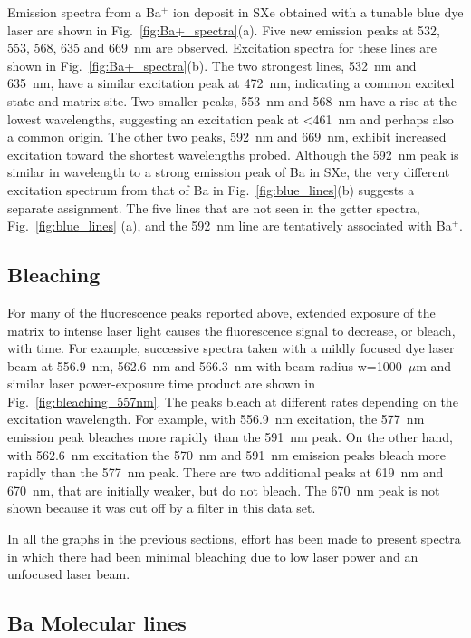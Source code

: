 \documentclass[aps,pra,reprint,superscriptaddress]{revtex4-1}
\begin{document}
Emission spectra from a Ba$^+ $ ion deposit in SXe obtained with a tunable blue dye laser are shown in Fig.~\ref{fig:Ba+_spectra}(a).
Five new emission peaks at 532, 553, 568, 635 and 669~nm are observed.
Excitation spectra for these lines are shown in Fig.~\ref{fig:Ba+_spectra}(b).
The two strongest lines, 532~nm and 635~nm, have a similar excitation peak at 472~nm, indicating a common excited state and matrix site.
Two smaller peaks, 553~nm and 568~nm have a rise at the lowest wavelengths, suggesting an excitation peak at \textless 461~nm and perhaps also a common origin.
The other two peaks, 592~nm and 669~nm, exhibit increased excitation toward the shortest wavelengths probed.
Although the 592~nm peak is similar in wavelength to a strong emission peak of Ba in SXe, the very different excitation spectrum from that of Ba in Fig.~\ref{fig:blue_lines}(b) suggests a separate assignment.
The five lines that are not seen in the getter spectra, Fig.~\ref{fig:blue_lines} (a), and the 592~nm line are tentatively associated with Ba$^+ $.


\subsection{Bleaching}

For many of the fluorescence peaks reported above, extended exposure of the matrix to intense laser light causes the fluorescence signal to decrease, or bleach, with time.
For example, successive spectra taken with a mildly focused dye laser beam at 556.9~nm, 562.6~nm and 566.3~nm with beam radius w=1000~$\mu$m and similar laser power-exposure time product are shown in Fig.~\ref{fig:bleaching_557nm}.
The peaks bleach at different rates depending on the excitation wavelength.
For example, with 556.9~nm excitation, the 577~nm emission peak bleaches more rapidly than the 591~nm peak.
On the other hand, with 562.6~nm excitation the 570~nm and 591~nm emission peaks bleach more rapidly than the 577~nm peak.
There are two additional peaks at 619~nm and 670~nm, that are initially weaker, but do not bleach.
The 670~nm peak is not shown because it was cut off by a filter in this data set.



In all the graphs in the previous sections, effort has been made to present spectra in which there had been minimal bleaching due to low laser power and an unfocused laser beam.

\subsection{Ba Molecular lines}
\end{document}
